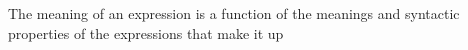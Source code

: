 The meaning of an expression is a function of the meanings and syntactic properties of the expressions that make it up
